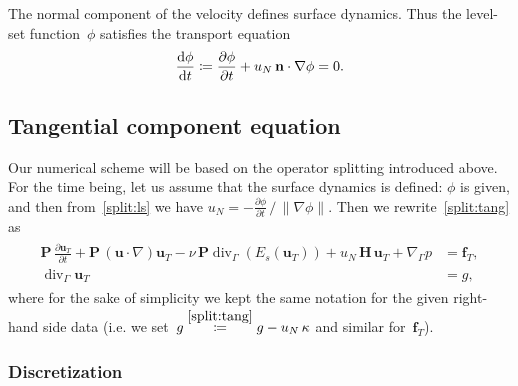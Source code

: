 \documentclass[12pt]{article}
\newcommand{\vect}[1]{\boldsymbol{\mathbf{#1}}}
\DeclareMathOperator{\Div}{div}
\begin{document}
The normal component of the velocity defines surface dynamics. Thus the level-set function~$\phi$ satisfies the transport equation
\begin{equation}\label{split:ls}
	\frac{\mbox d\phi}{\mbox d t} \coloneqq \frac{\partial \phi}{\partial t} + u_N\,\vect n\cdot\nabla\phi = 0.
\end{equation} 

\subsection{Tangential component equation}

Our numerical scheme will be based on the operator splitting introduced above. For the time being, let us assume that the surface dynamics is defined: $\phi$ is given, and then from~\eqref{split:ls} we have $u_N = -\frac{\partial \phi}{\partial t}\,/\,\|\nabla \phi\|$. Then we rewrite~\eqref{split:tang} as
\begin{align}\begin{split}\label{split:tang2}
	\vect P\,\frac{\partial\vect u_T}{\partial t} + \vect P\,(\vect u\cdot\nabla)\vect u_T - \nu\,\vect P\Div_\Gamma(E_s(\vect u_T)) + u_N\,\vect H\,\vect u_T + \nabla_\Gamma p &= \vect f_T,\\
	\Div_\Gamma \vect u_T &= g,
\end{split}\end{align}
where for the sake of simplicity we kept the same notation for the given right-hand side data (i.e. we set~$g \stackrel{\eqref{split:tang}}{\coloneqq} g - u_N\,\kappa$ and similar for~$\vect f_T$).

\subsubsection{Discretization}
\end{document}
